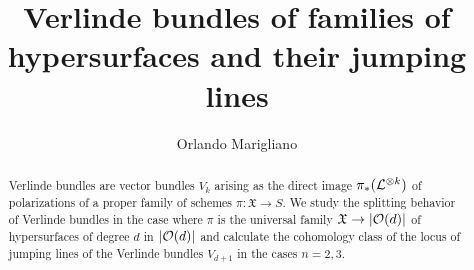 \documentclass[paper=A4,%
parskip=half,
draft=false,
abstracton
]{scrartcl}
\title{Verlinde bundles of families of hypersurfaces and their jumping lines}
\author{Orlando Marigliano}
\newcommand{\schemeofsurfaces}{\abs{\mc{O}(d)}}
\begin{document}
%
\maketitle
\begin{abstract}
	\noindent Verlinde bundles are vector bundles $V_k$ arising as the direct image $\pi_*(\mathcal{L}^{\otimes k})$ of polarizations of a proper family of schemes $\pi\colon \mathfrak X \to S$. We study the splitting behavior of Verlinde bundles in the case where $\pi$ is the universal family $\mathfrak X \to \schemeofsurfaces$ of hypersurfaces of degree $d$ in $\schemeofsurfaces$ and calculate the cohomology class of the locus of jumping lines of the Verlinde bundles
	$V_{d+1}$ in the cases $n=2,3$.  
\end{abstract}
%
%
%
%
%
%




%

%

%

\printbibliography[heading=bibintoc]
\end{document}
